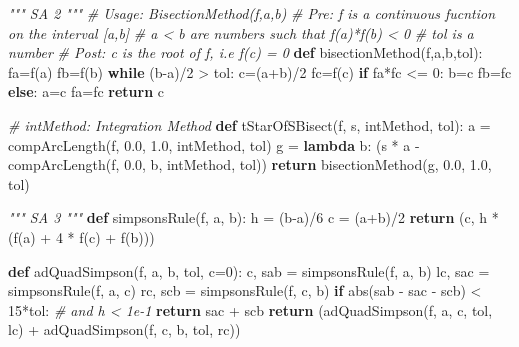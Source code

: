 \documentclass[11pt]{article}
\newenvironment{Shaded}{}{}
\newcommand{\KeywordTok}[1]{\textcolor[rgb]{0.00,0.44,0.13}{\textbf{{#1}}}}
\newcommand{\DecValTok}[1]{\textcolor[rgb]{0.25,0.63,0.44}{{#1}}}
\newcommand{\FloatTok}[1]{\textcolor[rgb]{0.25,0.63,0.44}{{#1}}}
\newcommand{\CommentTok}[1]{\textcolor[rgb]{0.38,0.63,0.69}{\textit{{#1}}}}
\newcommand{\NormalTok}[1]{{#1}}
\newcommand{\ControlFlowTok}[1]{\textcolor[rgb]{0.00,0.44,0.13}{\textbf{{#1}}}}
\newcommand{\OperatorTok}[1]{\textcolor[rgb]{0.40,0.40,0.40}{{#1}}}
\newcommand{\BuiltInTok}[1]{{#1}}
\begin{document}
\begin{Shaded}
\begin{Highlighting}[]
\CommentTok{""" SA 2 """}
\CommentTok{# Usage:    BisectionMethod(f,a,b)}
\CommentTok{# Pre:      f is a continuous fucntion on the interval [a,b]}
\CommentTok{#           a < b are numbers such that f(a)*f(b) < 0}
\CommentTok{#           tol is a number}
\CommentTok{# Post:     c is the root of f, i.e f(c) = 0}
\KeywordTok{def}\NormalTok{ bisectionMethod(f,a,b,tol):}
\NormalTok{    fa}\OperatorTok{=}\NormalTok{f(a)}
\NormalTok{    fb}\OperatorTok{=}\NormalTok{f(b)}
    \ControlFlowTok{while}\NormalTok{ (b}\OperatorTok{-}\NormalTok{a)}\OperatorTok{/}\DecValTok{2} \OperatorTok{>}\NormalTok{ tol:}
\NormalTok{        c}\OperatorTok{=}\NormalTok{(a}\OperatorTok{+}\NormalTok{b)}\OperatorTok{/}\DecValTok{2}
\NormalTok{        fc}\OperatorTok{=}\NormalTok{f(c)}
        \ControlFlowTok{if}\NormalTok{ fa}\OperatorTok{*}\NormalTok{fc }\OperatorTok{<=} \DecValTok{0}\NormalTok{:}
\NormalTok{            b}\OperatorTok{=}\NormalTok{c}
\NormalTok{            fb}\OperatorTok{=}\NormalTok{fc}
        \ControlFlowTok{else}\NormalTok{:}
\NormalTok{            a}\OperatorTok{=}\NormalTok{c}
\NormalTok{            fa}\OperatorTok{=}\NormalTok{fc}
    \ControlFlowTok{return}\NormalTok{ c}

\CommentTok{# intMethod: Integration Method}
\KeywordTok{def}\NormalTok{ tStarOfSBisect(f, s, intMethod, tol):}
\NormalTok{    a }\OperatorTok{=}\NormalTok{ compArcLength(f, }\FloatTok{0.0}\NormalTok{, }\FloatTok{1.0}\NormalTok{, intMethod, tol)}
\NormalTok{    g }\OperatorTok{=} \KeywordTok{lambda}\NormalTok{ b: (s }\OperatorTok{*}\NormalTok{ a }\OperatorTok{-}\NormalTok{ compArcLength(f, }\FloatTok{0.0}\NormalTok{, b, intMethod, tol))}
    \ControlFlowTok{return}\NormalTok{ bisectionMethod(g, }\FloatTok{0.0}\NormalTok{, }\FloatTok{1.0}\NormalTok{, tol)}

\CommentTok{""" SA 3 """}
\KeywordTok{def}\NormalTok{ simpsonsRule(f, a, b):}
\NormalTok{    h }\OperatorTok{=}\NormalTok{ (b}\OperatorTok{-}\NormalTok{a)}\OperatorTok{/}\DecValTok{6}
\NormalTok{    c }\OperatorTok{=}\NormalTok{ (a}\OperatorTok{+}\NormalTok{b)}\OperatorTok{/}\DecValTok{2}
    \ControlFlowTok{return}\NormalTok{ (c, h }\OperatorTok{*}\NormalTok{ (f(a) }\OperatorTok{+} \DecValTok{4} \OperatorTok{*}\NormalTok{ f(c) }\OperatorTok{+}\NormalTok{ f(b)))}

\KeywordTok{def}\NormalTok{ adQuadSimpson(f, a, b, tol, c}\OperatorTok{=}\DecValTok{0}\NormalTok{):}
\NormalTok{    c, sab }\OperatorTok{=}\NormalTok{ simpsonsRule(f, a, b)}
\NormalTok{    lc, sac  }\OperatorTok{=}\NormalTok{ simpsonsRule(f, a, c)}
\NormalTok{    rc, scb }\OperatorTok{=}\NormalTok{ simpsonsRule(f, c, b)}
    \ControlFlowTok{if} \BuiltInTok{abs}\NormalTok{(sab }\OperatorTok{-}\NormalTok{ sac }\OperatorTok{-}\NormalTok{ scb) }\OperatorTok{<} \DecValTok{15}\OperatorTok{*}\NormalTok{tol: }\CommentTok{#  and h < 1e-1}
        \ControlFlowTok{return}\NormalTok{ sac }\OperatorTok{+}\NormalTok{ scb}
    \ControlFlowTok{return}\NormalTok{ (adQuadSimpson(f, a, c, tol, lc) }\OperatorTok{+}
\NormalTok{           adQuadSimpson(f, c, b, tol, rc))}
    

\end{Highlighting}
\end{Shaded}
\end{document}
